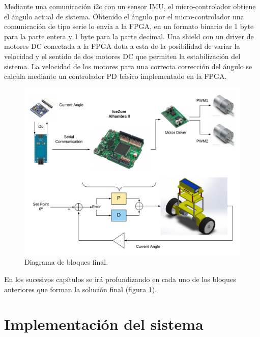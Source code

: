 Mediante una comunicación i2c con un sensor IMU, el micro-controlador obtiene el ángulo actual de sistema. Obtenido el ángulo por el micro-controlador una comunicación de tipo serie lo envía a la FPGA, en un formato binario de 1 byte para la parte entera y 1 byte para la parte decimal. Una shield con un driver de motores DC conectada a la FPGA dota a esta de la posibilidad de variar la velocidad y el sentido de dos motores DC que permiten la estabilización del sistema. La velocidad de los motores para una correcta corrección del ángulo se calcula mediante un controlador PD básico implementado en la FPGA.

\begin{center}
	\begin{figure}[H]
		\center
		\includegraphics[trim = 0mm 0mm 0mm 0mm,clip, angle=0, scale = 0.6]{imagenes/Balancing_Robot/final.pdf}
		\caption{Diagrama de bloques final.}
		\label{fig:final}
	\end{figure}
\end{center}


En los sucesivos capítulos se irá profundizando en cada uno de los bloques anteriores que forman la solución final (figura \ref{fig:final}). 


\newpage
\section{Implementación del sistema}\label{sec:Implementacion}
